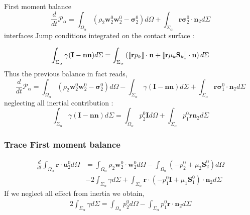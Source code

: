 \documentclass{sintefbeamer}
\newcommand{\Jump}[1]{\llbracket #1 \rrbracket \cdot \textbf{n} }
\newcommand{\ddt}{\frac{d}{d t}}
\begin{document}
\begin{frame}
  {First moment balance}
  \begin{equation}
    \ddt \mathcal{P}_\alpha
    = \int_{\Omega_\alpha} \left(
        \rho_2  \textbf{w}_2^0 \textbf{w}_2^0 
        - \bm{\sigma}_2^0
    \right) d\Omega
    + \int_{\Sigma_\alpha} \textbf{r}\bm{\sigma}_2^0\cdot\textbf{n}_2 d\Sigma
\end{equation}
interfaces Jump conditions integrated  on the contact surface :

\begin{equation}
  \int_{\Sigma_\alpha}
  \gamma (\textbf{I}-\textbf{nn})
  d\Sigma
  = 
  \int_{\Sigma_\alpha}\left(
    \Jump{\textbf{r}p_k}
    +
    \Jump{\textbf{r}\mu_k\textbf S_k }
    \right)
  d\Sigma
\end{equation}
Thus the previous balance in fact reads,
\begin{equation}
  \ddt \mathcal{P}_\alpha
  = \int_{\Omega_\alpha} \left(
      \rho_2  \textbf{w}_2^0 \textbf{w}_2^0 
      - \bm{\sigma}_2^0
  \right) d\Omega
  -\int_{\Sigma_\alpha}
  \gamma (\textbf{I}-\textbf{nn})
  d\Sigma 
  + \int_{\Sigma_\alpha} \textbf{r}\bm{\sigma}_1^0\cdot\textbf{n}_2 d\Sigma
\end{equation}
neglecting all inertial contribution : 
\begin{equation}
  \int_{\Sigma_\alpha}
  \gamma (\textbf{I}-\textbf{nn})
  d\Sigma 
  = \int_{\Omega_\alpha}
      p_2^0 \textbf{I}
   d\Omega
  + \int_{\Sigma_\alpha} p_1^0 \textbf{r}\textbf{n}_2 d\Sigma
\end{equation}



\end{frame}
\begin{frame}
  \frametitle{Trace First moment balance}
  \begin{align*}
    \ddt \int_{\Omega_\alpha}
    \textbf{r}\cdot\textbf{u}_2^0
    d\Omega
    &= \int_{\Omega_\alpha} 
    \rho_2  \textbf{w}_2^0 \cdot\textbf{w}_2^0 
    d\Omega
    - \int_{\Omega_\alpha} \left(
        - p_2^0
        + \mu_2\textbf{S}^0_2
    \right) d\Omega\\
    &-2\int_{\Sigma_\alpha}
    \gamma 
    d\Sigma 
    + \int_{\Sigma_\alpha} \textbf{r}\cdot \left(
      - p_1^0 \textbf{I}
      + \mu_1\textbf{S}^0_1
  \right)\cdot\textbf{n}_2 d\Sigma
  \end{align*}
  If we neglect all effect from inertia we obtain, 
  \begin{align*}
    2\int_{\Sigma_\alpha}
    \gamma 
    d\Sigma 
    =
    \int_{\Omega_\alpha} 
        p_2^0
     d\Omega
    - \int_{\Sigma_\alpha}
       p_1^0
      \textbf{r}\cdot \textbf{n}_2 d\Sigma
  \end{align*}
  

\end{frame}
\end{document}
